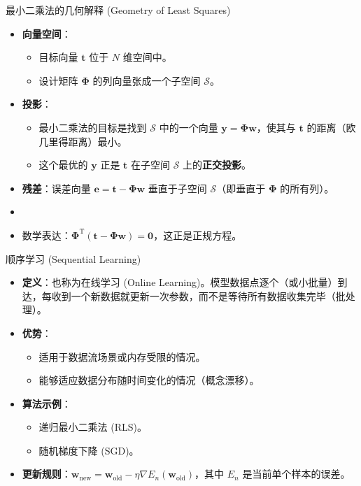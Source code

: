 \documentclass[12pt, aspectratio=169]{beamer}
\newcommand{\vect}[1]{\mathbf{#1}}
\begin{document}
\begin{frame}{最小二乘法的几何解释 (Geometry of Least Squares)}
    \begin{itemize}
        \item \textbf{向量空间}：
        \begin{itemize}
            \item 目标向量 $\vect{t}$ 位于 $N$ 维空间中。
            \item 设计矩阵 $\boldsymbol{\Phi}$ 的列向量张成一个子空间 $\mathcal{S}$。
        \end{itemize}
        \item \textbf{投影}：
        \begin{itemize}
            \item 最小二乘法的目标是找到 $\mathcal{S}$ 中的一个向量 $\vect{y} = \boldsymbol{\Phi}\vect{w}$，使其与 $\vect{t}$ 的距离（欧几里得距离）最小。
            \item 这个最优的 $\vect{y}$ 正是 $\vect{t}$ 在子空间 $\mathcal{S}$ 上的\textbf{正交投影}。
        \end{itemize}
        \item \textbf{残差}：误差向量 $\vect{e} = \vect{t} - \boldsymbol{\Phi}\vect{w}$ 垂直于子空间 $\mathcal{S}$（即垂直于 $\boldsymbol{\Phi}$ 的所有列）。
        \item \item 数学表达：$\boldsymbol{\Phi}^{\mathrm{T}} (\vect{t} - \boldsymbol{\Phi}\vect{w}) = \vect{0}$，这正是正规方程。
    \end{itemize}
\end{frame}

\begin{frame}{顺序学习 (Sequential Learning)}
    \begin{itemize}
        \item \textbf{定义}：也称为在线学习 (Online Learning)。模型数据点逐个（或小批量）到达，每收到一个新数据就更新一次参数，而不是等待所有数据收集完毕（批处理）。
        \item \textbf{优势}：
        \begin{itemize}
            \item 适用于数据流场景或内存受限的情况。
            \item 能够适应数据分布随时间变化的情况（概念漂移）。
        \end{itemize}
        \item \textbf{算法示例}：
        \begin{itemize}
            \item 递归最小二乘法 (RLS)。
            \item 随机梯度下降 (SGD)。
        \end{itemize}
        \item \textbf{更新规则}：$\vect{w}_{\mathrm{new}} = \vect{w}_{\mathrm{old}} - \eta \nabla E_n(\vect{w}_{\mathrm{old}})$，其中 $E_n$ 是当前单个样本的误差。
    \end{itemize}
\end{frame}
\end{document}
